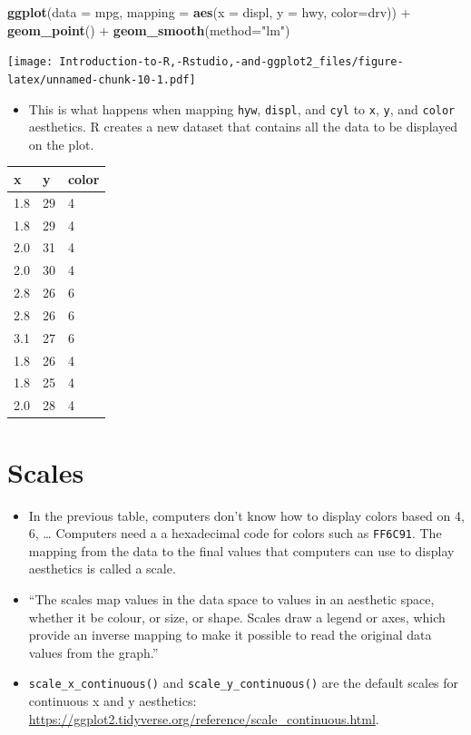 \documentclass[]{book}
\newenvironment{Shaded}{\begin{snugshade}}{\end{snugshade}}
\newcommand{\KeywordTok}[1]{\textcolor[rgb]{0.13,0.29,0.53}{\textbf{{#1}}}}
\newcommand{\DataTypeTok}[1]{\textcolor[rgb]{0.13,0.29,0.53}{{#1}}}
\newcommand{\StringTok}[1]{\textcolor[rgb]{0.31,0.60,0.02}{{#1}}}
\newcommand{\NormalTok}[1]{{#1}}
\providecommand{\tightlist}{%
  \setlength{\itemsep}{0pt}\setlength{\parskip}{0pt}}
\begin{document}
\begin{Shaded}
\begin{Highlighting}[]
\KeywordTok{ggplot}\NormalTok{(}\DataTypeTok{data =} \NormalTok{mpg, }\DataTypeTok{mapping =} \KeywordTok{aes}\NormalTok{(}\DataTypeTok{x =} \NormalTok{displ, }\DataTypeTok{y =} \NormalTok{hwy, }\DataTypeTok{color=}\NormalTok{drv)) +}\StringTok{ }\KeywordTok{geom_point}\NormalTok{() +}\StringTok{ }\KeywordTok{geom_smooth}\NormalTok{(}\DataTypeTok{method=}\StringTok{"lm"}\NormalTok{)}
\end{Highlighting}
\end{Shaded}

\texttt{[image: Introduction-to-R,-Rstudio,-and-ggplot2\_files/figure-latex/unnamed-chunk-10-1.pdf]}

\begin{itemize}
\tightlist
\item
  This is what happens when mapping \texttt{hyw}, \texttt{displ}, and
  \texttt{cyl} to \texttt{x}, \texttt{y}, and \texttt{color} aesthetics.
  R creates a new dataset that contains all the data to be displayed on
  the plot.
\end{itemize}

\begin{longtable}[]{@{}lll@{}}
\toprule
x & y & color\tabularnewline
\midrule
\endhead
1.8 & 29 & 4\tabularnewline
1.8 & 29 & 4\tabularnewline
2.0 & 31 & 4\tabularnewline
2.0 & 30 & 4\tabularnewline
2.8 & 26 & 6\tabularnewline
2.8 & 26 & 6\tabularnewline
3.1 & 27 & 6\tabularnewline
1.8 & 26 & 4\tabularnewline
1.8 & 25 & 4\tabularnewline
2.0 & 28 & 4\tabularnewline
\bottomrule
\end{longtable}

\section{Scales}\label{scales}

\begin{itemize}
\item
  In the previous table, computers don't know how to display colors
  based on 4, 6, \ldots{} Computers need a a hexadecimal code for colors
  such as \texttt{FF6C91}. The mapping from the data to the final values
  that computers can use to display aesthetics is called a scale.
\item
  ``The scales map values in the data space to values in an aesthetic
  space, whether it be colour, or size, or shape. Scales draw a legend
  or axes, which provide an inverse mapping to make it possible to read
  the original data values from the graph.'' \citep{ggplot2}
\item
  \texttt{scale\_x\_continuous()} and \texttt{scale\_y\_continuous()}
  are the default scales for continuous x and y aesthetics:
  \url{https://ggplot2.tidyverse.org/reference/scale_continuous.html}.
\end{itemize}
\end{document}
